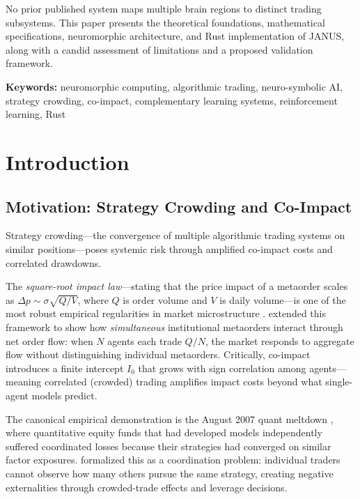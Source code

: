 \documentclass[12pt, a4paper]{article}
\begin{document}
No prior published system maps multiple brain regions to distinct trading subsystems. This paper presents the theoretical foundations, mathematical specifications, neuromorphic architecture, and Rust implementation of JANUS, along with a candid assessment of limitations and a proposed validation framework.

\vspace{0.5cm}
\noindent\textbf{Keywords:} neuromorphic computing, algorithmic trading, neuro-symbolic AI, strategy crowding, co-impact, complementary learning systems, reinforcement learning, Rust

\newpage
\tableofcontents
\newpage

\section{Introduction}
\label{sec:introduction}

\subsection{Motivation: Strategy Crowding and Co-Impact}
\label{sec:crowding_motivation}

Strategy crowding---the convergence of multiple algorithmic trading systems on similar positions---poses systemic risk through amplified co-impact costs and correlated drawdowns.

The \textit{square-root impact law}---stating that the price impact of a metaorder scales as $\Delta p \sim \sigma \sqrt{Q/V}$, where $Q$ is order volume and $V$ is daily volume---is one of the most robust empirical regularities in market microstructure \citep{toth2011anomalous, bouchaud2018trades, bucci2019crossover}. \citet{bucci2020coimpact} extended this framework to show how \textit{simultaneous} institutional metaorders interact through net order flow: when $N$ agents each trade $Q/N$, the market responds to aggregate flow without distinguishing individual metaorders. Critically, co-impact introduces a finite intercept $I_0$ that grows with sign correlation among agents---meaning correlated (crowded) trading amplifies impact costs beyond what single-agent models predict.

The canonical empirical demonstration is the August 2007 quant meltdown \citep{khandani2011quants}, where quantitative equity funds that had developed models independently suffered coordinated losses because their strategies had converged on similar factor exposures. \citet{stein2009crowding} formalized this as a coordination problem: individual traders cannot observe how many others pursue the same strategy, creating negative externalities through crowded-trade effects and leverage decisions.
\end{document}
